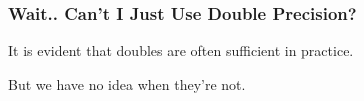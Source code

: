 \begin{frame}

\frametitle{Wait.. Can't I Just Use Double Precision?}

\vspace{\fill}

\begin{center}

It is evident that doubles are often sufficient in practice.

\vspace{\fill}

But we have no idea when they're not.

\end{center}

\vspace{\fill}






\end{frame}
